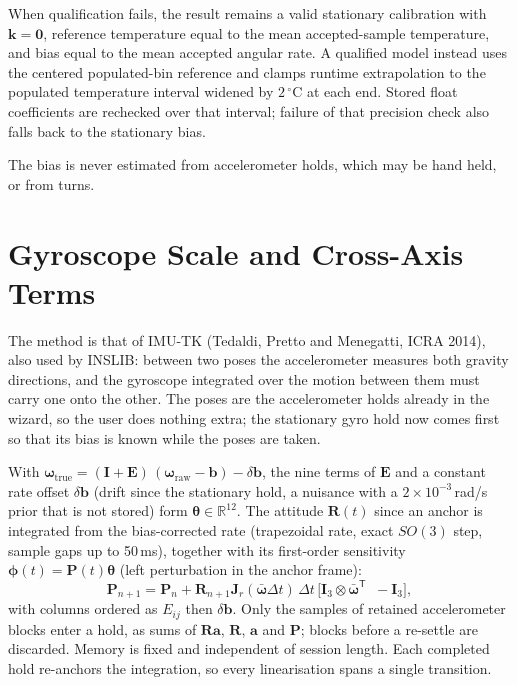 \documentclass[conference]{IEEEtran}
\begin{document}
    When qualification fails, the result remains a valid stationary
    calibration with $\mathbf{k}=\mathbf{0}$, reference temperature equal
    to the mean accepted-sample temperature, and bias equal to the mean
    accepted angular rate.  A qualified model instead uses the centered
    populated-bin reference and clamps runtime extrapolation to the populated
    temperature interval widened by $2\,{}^\circ$C at each end.  Stored
    float coefficients are rechecked over that interval; failure of that
    precision check also falls back to the stationary bias.

    The bias is never estimated from accelerometer holds, which may be
    hand held, or from turns.

    \section{Gyroscope Scale and Cross-Axis Terms}
    \label{sec:gyro_axes}

    The method is that of IMU-TK (Tedaldi, Pretto and Menegatti, ICRA 2014),
    also used by INSLIB: between two poses the accelerometer measures both
    gravity directions, and the gyroscope integrated over the motion between
    them must carry one onto the other. The poses are the accelerometer
    holds already in the wizard, so the user does nothing extra; the
    stationary gyro hold now comes first so that its bias is known while
    the poses are taken.

    With $\boldsymbol{\omega}_\text{true} = (\mathbf{I}+\mathbf{E})\,
    (\boldsymbol{\omega}_\text{raw} - \mathbf{b}) - \delta\mathbf{b}$, the
    nine terms of $\mathbf{E}$ and a constant rate offset
    $\delta\mathbf{b}$ (drift since the stationary hold, a nuisance with a
    $2\times10^{-3}$\,rad/s prior that is not stored) form
    $\boldsymbol{\theta}\in\mathbb{R}^{12}$. The attitude
    $\mathbf{R}(t)$ since an anchor is integrated from the bias-corrected
    rate (trapezoidal rate, exact $SO(3)$ step, sample gaps up to 50\,ms),
    together with its first-order sensitivity
    $\boldsymbol{\phi}(t)=\mathbf{P}(t)\boldsymbol{\theta}$ (left
    perturbation in the anchor frame):
    \begin{equation}
        \mathbf{P}_{n+1} = \mathbf{P}_n + \mathbf{R}_{n+1}\mathbf{J}_r(\bar{\boldsymbol{\omega}}\Delta t)\,
        \Delta t\,\bigl[\mathbf{I}_3\otimes\bar{\boldsymbol{\omega}}^{\mathsf T} \;\; -\mathbf{I}_3\bigr],
    \end{equation}
    with columns ordered as $E_{ij}$ then $\delta\mathbf{b}$. Only the
    samples of retained accelerometer blocks enter a hold, as sums of
    $\mathbf{R}\mathbf{a}$, $\mathbf{R}$, $\mathbf{a}$ and $\mathbf{P}$;
    blocks before a re-settle are discarded. Memory is fixed and independent
    of session length. Each completed hold re-anchors the integration, so
    every linearisation spans a single transition.
\end{document}
